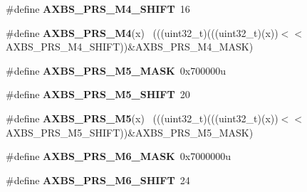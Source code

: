 \begin{DoxyCompactItemize}
\item 
\hypertarget{group___a_x_b_s___register___masks_gaa5c41d2e8da4620d83b63f9ffb3878cd}{}\#define {\bfseries A\+X\+B\+S\+\_\+\+P\+R\+S\+\_\+\+M4\+\_\+\+S\+H\+I\+F\+T}~16\label{group___a_x_b_s___register___masks_gaa5c41d2e8da4620d83b63f9ffb3878cd}

\item 
\hypertarget{group___a_x_b_s___register___masks_ga41c0afaf3c47955a57a3628fb431d892}{}\#define {\bfseries A\+X\+B\+S\+\_\+\+P\+R\+S\+\_\+\+M4}(x)                                                  ~(((uint32\+\_\+t)(((uint32\+\_\+t)(x))$<$$<$A\+X\+B\+S\+\_\+\+P\+R\+S\+\_\+\+M4\+\_\+\+S\+H\+I\+F\+T))\&A\+X\+B\+S\+\_\+\+P\+R\+S\+\_\+\+M4\+\_\+\+M\+A\+S\+K)\label{group___a_x_b_s___register___masks_ga41c0afaf3c47955a57a3628fb431d892}

\item 
\hypertarget{group___a_x_b_s___register___masks_ga6fe3afeef7171b168ddfa8341c88b0dc}{}\#define {\bfseries A\+X\+B\+S\+\_\+\+P\+R\+S\+\_\+\+M5\+\_\+\+M\+A\+S\+K}~0x700000u\label{group___a_x_b_s___register___masks_ga6fe3afeef7171b168ddfa8341c88b0dc}

\item 
\hypertarget{group___a_x_b_s___register___masks_gabbebbaa7c8027c5ce2bfc3796cbdaac1}{}\#define {\bfseries A\+X\+B\+S\+\_\+\+P\+R\+S\+\_\+\+M5\+\_\+\+S\+H\+I\+F\+T}~20\label{group___a_x_b_s___register___masks_gabbebbaa7c8027c5ce2bfc3796cbdaac1}

\item 
\hypertarget{group___a_x_b_s___register___masks_gacbfcf23c1f81c3c93331d1573b22502e}{}\#define {\bfseries A\+X\+B\+S\+\_\+\+P\+R\+S\+\_\+\+M5}(x)                                                  ~(((uint32\+\_\+t)(((uint32\+\_\+t)(x))$<$$<$A\+X\+B\+S\+\_\+\+P\+R\+S\+\_\+\+M5\+\_\+\+S\+H\+I\+F\+T))\&A\+X\+B\+S\+\_\+\+P\+R\+S\+\_\+\+M5\+\_\+\+M\+A\+S\+K)\label{group___a_x_b_s___register___masks_gacbfcf23c1f81c3c93331d1573b22502e}

\item 
\hypertarget{group___a_x_b_s___register___masks_ga7c19858574d86df826048faa73e8d4c3}{}\#define {\bfseries A\+X\+B\+S\+\_\+\+P\+R\+S\+\_\+\+M6\+\_\+\+M\+A\+S\+K}~0x7000000u\label{group___a_x_b_s___register___masks_ga7c19858574d86df826048faa73e8d4c3}

\item 
\hypertarget{group___a_x_b_s___register___masks_gab9f6b39262ff948c4fa802f4836d08a5}{}\#define {\bfseries A\+X\+B\+S\+\_\+\+P\+R\+S\+\_\+\+M6\+\_\+\+S\+H\+I\+F\+T}~24\label{group___a_x_b_s___register___masks_gab9f6b39262ff948c4fa802f4836d08a5}


\end{DoxyCompactItemize}
